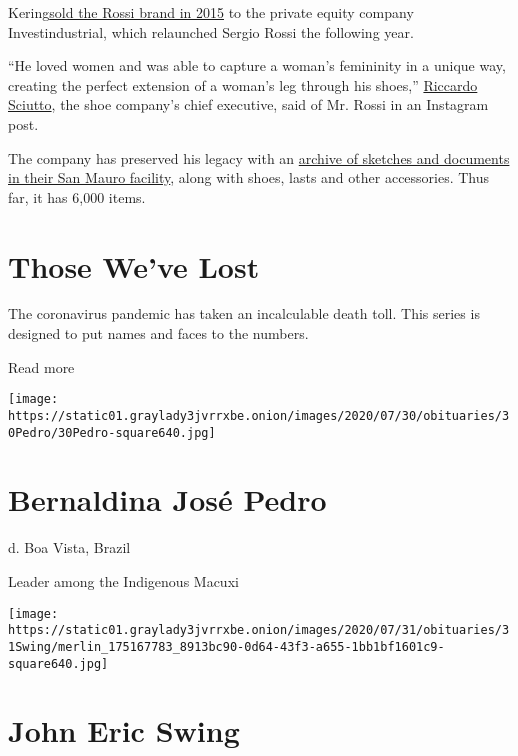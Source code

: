 Kering\href{https://www.nytimes3xbfgragh.onion/2015/12/10/business/dealbook/kering-sergio-rossi-investindustrial.html}{sold
the Rossi brand in 2015} to the private equity company Investindustrial,
which relaunched Sergio Rossi the following year.

``He loved women and was able to capture a woman's femininity in a
unique way, creating the perfect extension of a woman's leg through his
shoes,'' \href{https://www.instagram.com/p/B-hPwEKo0ug/}{Riccardo
Sciutto}, the shoe company's chief executive, said of Mr. Rossi in an
Instagram post.

The company has preserved his legacy with an
\href{https://aeworld.com/fashion/sergio-rossi-launches-a-new-project-that-celebrates-its-heritage/}{archive
of sketches and documents in their San Mauro facility}, along with
shoes, lasts and other accessories. Thus far, it has 6,000 items.

\href{https://www.nytimes3xbfgragh.onion/interactive/2020/obituaries/people-died-coronavirus-obituaries.html?action=click\&pgtype=Article\&state=default\&region=BELOW_MAIN_CONTENT\&context=covid_obits_promo}{}

\hypertarget{those-weve-lost}{%
\section{Those We've Lost}\label{those-weve-lost}}

The coronavirus pandemic has taken an incalculable death toll. This
series is designed to put names and faces to the numbers.

Read more

\texttt{[image: https://static01.graylady3jvrrxbe.onion/images/2020/07/30/obituaries/30Pedro/30Pedro-square640.jpg]}

\hypertarget{bernaldina-josuxe9-pedro}{%
\section{Bernaldina José Pedro}\label{bernaldina-josuxe9-pedro}}

d. Boa Vista, Brazil

Leader among the Indigenous Macuxi

\texttt{[image: https://static01.graylady3jvrrxbe.onion/images/2020/07/31/obituaries/31Swing/merlin\_175167783\_8913bc90-0d64-43f3-a655-1bb1bf1601c9-square640.jpg]}

\hypertarget{john-eric-swing}{%
\section{John Eric Swing}\label{john-eric-swing}}

